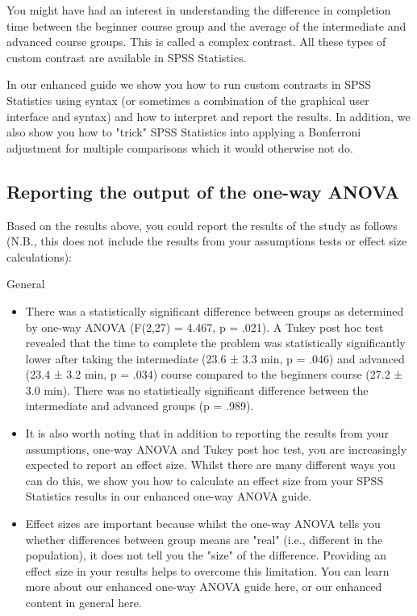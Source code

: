 \documentclass[]{article}
\begin{document}
You might have had an interest in understanding the difference in completion time between the beginner course group and the average of the intermediate and advanced course groups. This is called a complex contrast. All these types of custom contrast are available in SPSS Statistics. 

In our enhanced guide we show you how to run custom contrasts in SPSS Statistics using syntax (or sometimes a combination of the graphical user interface and syntax) and how to interpret and report the results. In addition, we also show you how to "trick" SPSS Statistics into applying a Bonferroni adjustment for multiple comparisons which it would otherwise not do.

\subsection*{Reporting the output of the one-way ANOVA}
Based on the results above, you could report the results of the study as follows (N.B., this does not include the results from your assumptions tests or effect size calculations):

General
\begin{itemize}
	\item There was a statistically significant difference between groups as determined by one-way ANOVA (F(2,27) = 4.467, p = .021). A Tukey post hoc test revealed that the time to complete the problem was statistically significantly lower after taking the intermediate (23.6 ± 3.3 min, p = .046) and advanced (23.4 ± 3.2 min, p = .034) course compared to the beginners course (27.2 ± 3.0 min). There was no statistically significant difference between the intermediate and advanced groups (p = .989).
	
	
\item It is also worth noting that in addition to reporting the results from your assumptions, one-way ANOVA and Tukey post hoc test, you are increasingly expected to report an effect size. Whilst there are many different ways you can do this, we show you how to calculate an effect size from your SPSS Statistics results in our enhanced one-way ANOVA guide. 
\item Effect sizes are important because whilst the one-way ANOVA tells you whether differences between group means are "real" (i.e., different in the population), it does not tell you the "size" of the difference. Providing an effect size in your results helps to overcome this limitation. You can learn more about our enhanced one-way ANOVA guide here, or our enhanced content in general here.
\end{itemize}
\end{document}

